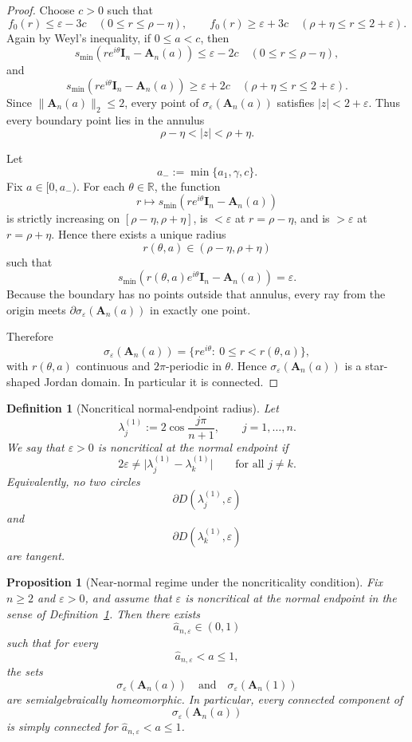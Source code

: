 \documentclass[11pt]{article}
\newtheorem{proposition}[theorem]{Proposition}
\newtheorem{definition}[theorem]{Definition}
\newcommand{\R}{\mathbb{R}}
\begin{document}
\begin{proof}
Choose \(c>0\) such that
\[
f_0(r)\le \varepsilon-3c
\quad (0\le r\le \rho-\eta),
\qquad
f_0(r)\ge \varepsilon+3c
\quad (\rho+\eta\le r\le 2+\varepsilon).
\]
Again by Weyl's inequality, if \(0\le a<c\), then
\[
s_{\min}(re^{i\theta}\mathbf I_n-\mathbf A_n(a))\le \varepsilon-2c
\quad (0\le r\le \rho-\eta),
\]
and
\[
s_{\min}(re^{i\theta}\mathbf I_n-\mathbf A_n(a))\ge \varepsilon+2c
\quad (\rho+\eta\le r\le 2+\varepsilon).
\]
Since \(\|\mathbf A_n(a)\|_2\le 2\), every point of \(\sigma_\varepsilon(\mathbf A_n(a))\) satisfies \(|z|<2+\varepsilon\). Thus every boundary point lies in the annulus
\[
\rho-\eta<|z|<\rho+\eta.
\]

Let
\[
a_-:=\min\{a_1,\gamma,c\}.
\]
Fix \(a\in[0,a_-)\). For each \(\theta\in\R\), the function
\[
r\longmapsto s_{\min}(re^{i\theta}\mathbf I_n-\mathbf A_n(a))
\]
is strictly increasing on \([\rho-\eta,\rho+\eta]\), is \(<\varepsilon\) at \(r=\rho-\eta\), and is \(>\varepsilon\) at \(r=\rho+\eta\). Hence there exists a unique radius
\[
r(\theta,a)\in(\rho-\eta,\rho+\eta)
\]
such that
\[
s_{\min}(r(\theta,a)e^{i\theta}\mathbf I_n-\mathbf A_n(a))=\varepsilon.
\]
Because the boundary has no points outside that annulus, every ray from the origin meets
\(\partial\sigma_\varepsilon(\mathbf A_n(a))\) in exactly one point.

Therefore
\[
\sigma_\varepsilon(\mathbf A_n(a))
=
\{re^{i\theta}:\ 0\le r<r(\theta,a)\},
\]
with \(r(\theta,a)\) continuous and \(2\pi\)-periodic in \(\theta\). Hence
\(\sigma_\varepsilon(\mathbf A_n(a))\) is a star-shaped Jordan domain. In particular it is connected.
\end{proof}

\begin{definition}[Noncritical normal-endpoint radius]\label{def:noncritical}
Let
\[
\lambda_j^{(1)}:=2\cos\frac{j\pi}{n+1},
\qquad j=1,\dots,n.
\]
We say that \(\varepsilon>0\) is \emph{noncritical at the normal endpoint} if
\[
2\varepsilon \neq \bigl|\lambda_j^{(1)}-\lambda_k^{(1)}\bigr|
\qquad\text{for all } j\neq k.
\]
Equivalently, no two circles
\[
\partial D(\lambda_j^{(1)},\varepsilon)
\]
and
\[
\partial D(\lambda_k^{(1)},\varepsilon)
\]
are tangent.
\end{definition}

\begin{proposition}[Near-normal regime under the noncriticality condition]\label{prop:near-normal}
Fix \(n\ge 2\) and \(\varepsilon>0\), and assume that \(\varepsilon\) is noncritical at the normal endpoint in the sense of Definition~\ref{def:noncritical}. Then there exists
\[
\widehat a_{n,\varepsilon}\in(0,1)
\]
such that for every
\[
\widehat a_{n,\varepsilon}<a\le 1,
\]
the sets
\[
\sigma_\varepsilon(\mathbf A_n(a))
\quad\text{and}\quad
\sigma_\varepsilon(\mathbf A_n(1))
\]
are semialgebraically homeomorphic. In particular, every connected component of
\[
\sigma_\varepsilon(\mathbf A_n(a))
\]
is simply connected for \(\widehat a_{n,\varepsilon}<a\le 1\).
\end{proposition}
\end{document}
